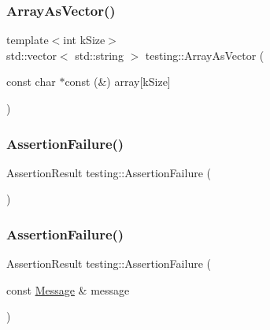 \mbox{\label{namespacetesting_ab25cc403881367e4ae289dab4eb37f5d}} 
\subsubsection{\texorpdfstring{ArrayAsVector()}{ArrayAsVector()}}
{\footnotesize\ttfamily template$<$int k\+Size$>$ \\
std\+::vector$<$ std\+::string $>$ testing\+::\+Array\+As\+Vector (\begin{DoxyParamCaption}\item[{const char $\ast$const (\&)}]{array\mbox{[}k\+Size\mbox{]} }\end{DoxyParamCaption})}

\mbox{\label{namespacetesting_a75cb789614cb1c28c34627a4a3c053df}} 
\subsubsection{\texorpdfstring{AssertionFailure()}{AssertionFailure()}\hspace{0.1cm}{\footnotesize\ttfamily [1/2]}}
{\footnotesize\ttfamily Assertion\+Result testing\+::\+Assertion\+Failure (\begin{DoxyParamCaption}{ }\end{DoxyParamCaption})}

\mbox{\label{namespacetesting_a56f59110a218942d2fc4695914b1685c}} 
\subsubsection{\texorpdfstring{AssertionFailure()}{AssertionFailure()}\hspace{0.1cm}{\footnotesize\ttfamily [2/2]}}
{\footnotesize\ttfamily Assertion\+Result testing\+::\+Assertion\+Failure (\begin{DoxyParamCaption}\item[{const \mbox{\hyperlink{classtesting_1_1_message}{Message}} \&}]{message }\end{DoxyParamCaption})}

